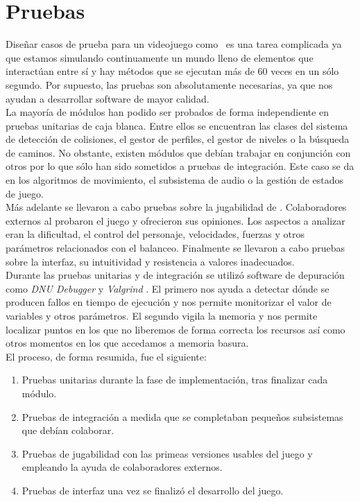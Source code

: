 \section{Pruebas}

Diseñar casos de prueba para un videojuego como \juego\ es una tarea complicada
ya que estamos simulando continuamente un mundo lleno de elementos que interactúan
entre sí y hay métodos que se ejecutan más de 60 veces en un sólo segundo.
Por supuesto, las pruebas son absolutamente necesarias, ya que nos ayudan
a desarrollar software de mayor calidad.\\

La mayoría de módulos han podido ser probados de forma independiente 
en pruebas unitarias de caja blanca. Entre ellos se encuentran las clases
del sistema de detección de colisiones, el gestor de perfiles, el gestor
de niveles o la búsqueda de caminos. No obstante, existen módulos que debían
trabajar en conjunción con otros por lo que sólo han sido sometidos a pruebas
de integración. Este caso se da en los algoritmos de movimiento, el subsistema
de audio o la gestión de estados de juego.\\

Más adelante se llevaron a cabo pruebas sobre la jugabilidad de \juego. Colaboradores
externos al probaron el juego y ofrecieron sus opiniones. Los aspectos a
analizar eran la dificultad, el control del personaje, velocidades,
fuerzas y otros parámetros relacionados con el balanceo. Finalmente
se llevaron a cabo pruebas sobre la interfaz, su intuitividad y resistencia
a valores inadecuados.\\

Durante las pruebas unitarias y de integración se utilizó software de depuración
como \textit{DNU Debugger} \cite{website:gdb} y \textit{Valgrind}
\cite{website:valgrind}. El primero nos ayuda a detectar
dónde se producen fallos en tiempo de ejecución y nos permite monitorizar
el valor de variables y otros parámetros. El segundo vigila la memoria
y nos permite localizar puntos en los que no liberemos de forma correcta
los recursos así como otros momentos en los que accedamos a memoria basura.\\

El proceso, de forma resumida, fue el siguiente:

\begin{enumerate}
    \itemsep0em
    \item Pruebas unitarias durante la fase de implementación, tras finalizar
    cada módulo.
    \item Pruebas de integración a medida que se completaban pequeños
    subsistemas que debían colaborar.
    \item Pruebas de jugabilidad con las primeas versiones usables del juego
    y empleando la ayuda de colaboradores externos.
    \item Pruebas de interfaz una vez se finalizó el desarrollo del juego.
\end{enumerate}

